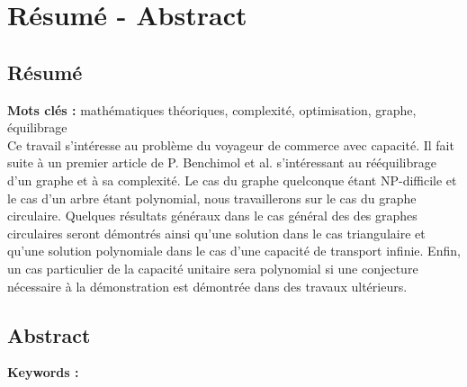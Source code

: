 \chapter*{Résumé - Abstract}

\section*{Résumé}

\textbf{Mots clés :} mathématiques théoriques, complexité, optimisation, graphe, équilibrage
\\

Ce travail s'intéresse au problème du voyageur de commerce avec capacité. Il fait suite à un premier article de P. Benchimol et al. s'intéressant au rééquilibrage d'un graphe et à sa complexité. Le cas du graphe quelconque étant NP-difficile et le cas d'un arbre étant polynomial, nous travaillerons sur le cas du graphe circulaire. Quelques résultats généraux dans le cas général des des graphes circulaires seront démontrés ainsi qu'une solution dans le cas triangulaire et qu'une solution polynomiale dans le cas d'une capacité de transport infinie. Enfin, un cas particulier de la capacité unitaire sera polynomial si une conjecture nécessaire à la démonstration est démontrée dans des travaux ultérieurs.
\\[1cm]

\section*{Abstract}

\textbf{Keywords :}
